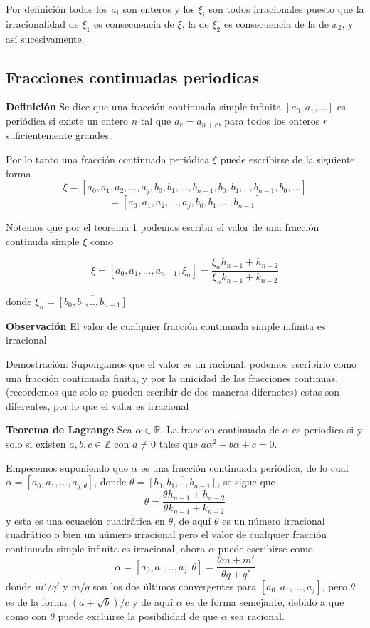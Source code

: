 \documentclass[11pt, article]{article}
\begin{document}
    Por definición todos los $a_i$ son enteros y los $\xi_i$ son todos irracionales puesto que la irracionalidad de $\xi_1$ es consecuencia de $\xi$, la de $\xi_2$ es consecuencia de la de $x_2$, y así sucesivamente.

    \subsection*{Fracciones continuadas periodicas}
    
    \textbf{Definición} Se dice que una fracción continuada simple infinita $[a_0,a_1,...]$ es periódica si existe un entero $n$ tal que $a_r=a_{n+r}$, para todos los enteros $r$ suficientemente grandes.
    
    Por lo tanto una fracción continuada periódica $\xi$ puede escribirse de la siguiente forma
        \[\xi=
        [a_0,a_1,a_2,...,a_j,b_0,b_1,...,b_{n-1},b_0,b_1,..,b_{n-1},b_{0},...]
        \]
        \[
        =[a_0,a_1,a_2,...,a_j,\overline{b_0,b_1,...,b_{n-1}}]
        \]
    
    Notemos que por el teorema 1 podemos escribir el valor de una fracción continuda simple $\xi$ como 

    \begin{equation}
    \xi=[a_0,a_1,...,a_{n-1},\xi_n]=\dfrac{\xi_n h_{n-1} + h_{n-2}}{\xi_n k_{n-1} + k_{n-2}}  \label{ecuacion_8}
    \end{equation}
    
    donde $\xi_n=\overline{[b_0,b_1,..,b_{n-1}]}$
    
    \textbf{Observación} El valor de cualquier fracción continuada simple infinita es irracional
    
    Demostración: Supongamos que el valor es un racional, podemos escribirlo como una fracción continuada finita, y por la unicidad de las fracciones continuas, (recordemos que solo se pueden escribir de dos maneras difernetes)  estas son diferentes, por lo que el valor es irracional
    
    

    \textbf{Teorema de Lagrange} Sea $\alpha \in \mathbb{R}$. La fraccion continuada de $\alpha$ es periodica si y solo si existen $a, b, c \in\mathbb{Z}$ con $a\not=0$ tales que $a\alpha^2 + b\alpha + c = 0$.

    Empecemos suponiendo que $\alpha$ es una fracción continuada periódica, de lo cual $\alpha= [a_0,a_1,...,a_{j,\theta}]$, donde $\theta=\overline{[b_0,b_1,..,b_{n-1}]}$, se sigue que
        \[
        \theta =\dfrac{\theta h_{n-1}+h_{n-2}}{\theta k_{n-1}+k_{n-2}}
        \]
    y esta es una ecuación cuadrática en $\theta$, de aquí $\theta$ es un número irracional cuadrático o bien un número irracional pero el valor de cualquier fracción continuada simple infinita es irracional, ahora $\alpha$ puede escribirse como 
        \[
        \alpha = [a_0,a_1,..,a_j,\theta]=\dfrac{\theta m + m'}{\theta q + q'}
        \]
    donde $m'/q'$ y $m/q$ son los dos últimos convergentes para $[a_0,a_1,...,a_j]$, pero $\theta$ es de la forma $(a + \sqrt{b})/c$ y de aquí $\alpha$ es de forma semejante, debido a que como con $\theta$ puede excluirse la posibilidad de que $\alpha$ sea racional.
\end{document}
